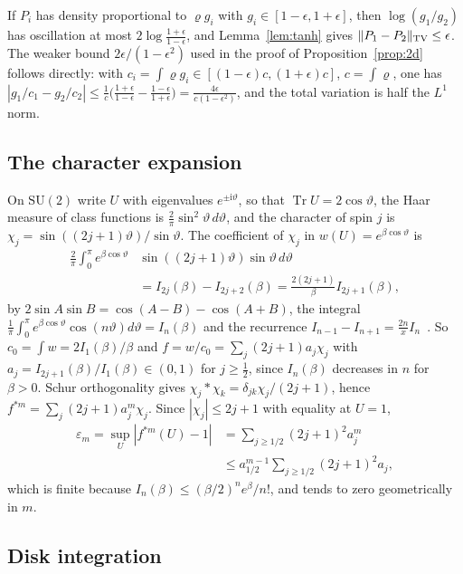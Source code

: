 \documentclass[aps,prd,twocolumn,superscriptaddress,nofootinbib,longbibliography,floatfix,amsmath,amssymb,10pt]{revtex4-2}
\theoremstyle{definition}
\theoremstyle{remark}
\newcommand{\SU}{\mathrm{SU}}
\newcommand{\Tr}{\operatorname{Tr}}
\begin{document}
If $P_i$ has density proportional to $\varrho g_i$ with $g_i\in[1-\epsilon,1+
\epsilon]$, then $\log(g_1/g_2)$ has oscillation at most $2\log\frac{1+\epsilon}
{1-\epsilon}$, and Lemma~\ref{lem:tanh} gives $\|P_1-P_2\|_{\rm TV}\le
\epsilon$. The weaker bound $2\epsilon/(1-\epsilon^2)$ used in the proof of
Proposition~\ref{prop:2d} follows directly: with $c_i=\int\varrho g_i\in
[(1-\epsilon)c,(1+\epsilon)c]$, $c=\int\varrho$, one has
$|g_1/c_1-g_2/c_2|\le\frac1c\bigl(\frac{1+\epsilon}{1-\epsilon}-\frac{1-
\epsilon}{1+\epsilon}\bigr)=\frac{4\epsilon}{c(1-\epsilon^2)}$, and the total
variation is half the $L^1$ norm.

\subsection{The character expansion}

On $\SU(2)$ write $U$ with eigenvalues $e^{\pm\mathrm i\vartheta}$, so that
$\Tr U=2\cos\vartheta$, the Haar measure of class functions is
$\frac2\pi\sin^2\vartheta\,d\vartheta$, and the character of spin $j$ is
$\chi_j=\sin((2j+1)\vartheta)/\sin\vartheta$. The coefficient of $\chi_j$ in
$w(U)=e^{\beta\cos\vartheta}$ is
\[
\begin{aligned}
\frac2\pi\int_0^\pi e^{\beta\cos\vartheta}&\sin((2j+1)\vartheta)\sin\vartheta
\,d\vartheta\\
&=I_{2j}(\beta)-I_{2j+2}(\beta)=\frac{2(2j+1)}\beta I_{2j+1}(\beta),
\end{aligned}
\]
by $2\sin A\sin B=\cos(A-B)-\cos(A+B)$, the integral $\frac1\pi\int_0^\pi
e^{\beta\cos\vartheta}\cos(n\vartheta)d\vartheta=I_n(\beta)$ and the recurrence
$I_{n-1}-I_{n+1}=\frac{2n}xI_n$~\cite[Sec.~3.71]{Wat44}. So
$c_0=\int w=2I_1(\beta)/\beta$ and $f=w/c_0=\sum_j(2j+1)a_j\chi_j$ with
$a_j=I_{2j+1}(\beta)/I_1(\beta)\in(0,1)$ for $j\ge\frac12$, since $I_n(\beta)$
decreases in $n$ for $\beta>0$. Schur orthogonality gives $\chi_j*\chi_k=
\delta_{jk}\chi_j/(2j+1)$, hence $f^{*m}=\sum_j(2j+1)a_j^m\chi_j$. Since
$|\chi_j|\le2j+1$ with equality at $U=1$,
\[
\begin{aligned}
\varepsilon_m=\sup_U|f^{*m}(U)-1|&=\sum_{j\ge1/2}(2j+1)^2a_j^m\\
&\le a_{1/2}^{m-1}\sum_{j\ge1/2}(2j+1)^2a_j,
\end{aligned}
\]
which is finite because $I_n(\beta)\le(\beta/2)^ne^{\beta}/n!$, and tends to
zero geometrically in $m$.

\subsection{Disk integration}
\end{document}
